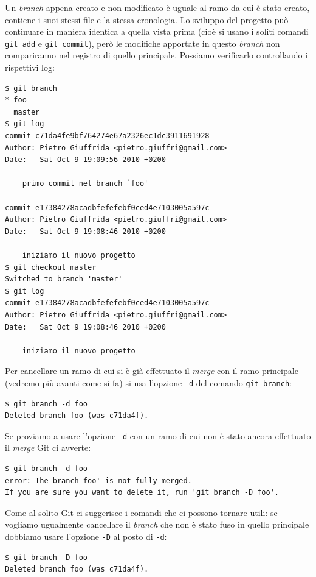 \documentclass[a4paper,12pt,oneside]{article}
\begin{document}
Un \emph{branch} appena creato e non modificato è uguale al ramo da cui è stato
creato, contiene i suoi stessi file e la stessa cronologia. Lo sviluppo del progetto
può continuare in maniera identica a quella vista prima (cioè si usano i soliti
comandi \lstinline|git add| e \lstinline|git commit|), però le modifiche apportate
in questo \emph{branch} non compariranno nel registro di quello principale. Possiamo
verificarlo controllando i rispettivi log:
\begin{lstlisting}
$ git branch 
* foo
  master
$ git log 
commit c71da4fe9bf764274e67a2326ec1dc3911691928
Author: Pietro Giuffrida <pietro.giuffri@gmail.com>
Date:   Sat Oct 9 19:09:56 2010 +0200

    primo commit nel branch `foo'

commit e17384278acadbfefefebf0ced4e7103005a597c
Author: Pietro Giuffrida <pietro.giuffri@gmail.com>
Date:   Sat Oct 9 19:08:46 2010 +0200

    iniziamo il nuovo progetto
$ git checkout master 
Switched to branch 'master'
$ git log 
commit e17384278acadbfefefebf0ced4e7103005a597c
Author: Pietro Giuffrida <pietro.giuffri@gmail.com>
Date:   Sat Oct 9 19:08:46 2010 +0200

    iniziamo il nuovo progetto
\end{lstlisting}

Per cancellare un ramo di cui si è già effettuato il \emph{merge} con il ramo
principale (vedremo più avanti come si fa) si usa l'opzione \lstinline|-d| del
comando \lstinline|git branch|:
\begin{lstlisting}
$ git branch -d foo 
Deleted branch foo (was c71da4f).
\end{lstlisting}
Se proviamo a usare l'opzione \lstinline|-d| con un ramo di cui non è stato
ancora effettuato il \emph{merge} Git ci avverte:
\begin{lstlisting}
$ git branch -d foo
error: The branch foo' is not fully merged.
If you are sure you want to delete it, run 'git branch -D foo'.
\end{lstlisting}
Come al solito Git ci suggerisce i comandi che ci possono tornare utili: se
vogliamo ugualmente cancellare il \emph{branch} che non è stato fuso in quello
principale dobbiamo usare l'opzione \lstinline|-D| al posto di \lstinline|-d|:
\begin{lstlisting}
$ git branch -D foo 
Deleted branch foo (was c71da4f).
\end{lstlisting}
\end{document}
